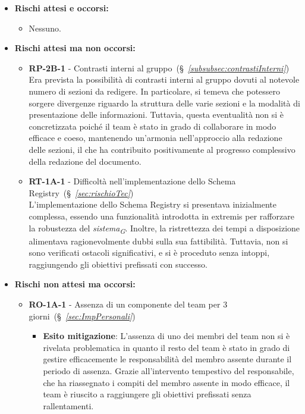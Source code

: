 \begin{itemize}
    \item \textbf{Rischi attesi e occorsi:}
        \begin{itemize}
            \item Nessuno.
        \end{itemize}
    \item \textbf{Rischi attesi ma non occorsi:}
        \begin{itemize}
            \item \textbf{RP-2B-1} - Contrasti interni al gruppo~(\S~\textit{\ref{subsubsec:contrastiInterni}}) \\
            Era prevista la possibilità di contrasti interni al gruppo dovuti al notevole numero di sezioni da redigere. In particolare, si temeva che potessero sorgere divergenze riguardo la struttura delle varie sezioni e la modalità di presentazione delle informazioni. Tuttavia, questa eventualità non si è concretizzata poiché il team è stato in grado di collaborare in modo efficace e coeso, mantenendo un'armonia nell'approccio alla redazione delle sezioni, il che ha contribuito positivamente al progresso complessivo della redazione del documento.
            \item \textbf{RT-1A-1} - Difficoltà nell’implementazione dello Schema Registry~(\S~\textit{\ref{sec:rischioTec}}) \\
            L'implementazione dello Schema Registry si presentava inizialmente complessa, essendo una funzionalità introdotta in extremis per rafforzare la robustezza del \textit{sistema}\textsubscript{\textit{G}}. Inoltre, la ristrettezza dei tempi a disposizione alimentava ragionevolmente dubbi sulla sua fattibilità. Tuttavia, non si sono verificati ostacoli significativi, e si è proceduto senza intoppi, raggiungendo gli obiettivi prefissati con successo.
        \end{itemize}
    \item \textbf{Rischi non attesi ma occorsi:}
        \begin{itemize}
            \item \textbf{RO-1A-1} - Assenza di un componente del team per 3 giorni~(\S~\textit{\ref{sec:ImpPersonali}})
                \begin{itemize}
                    \item \textbf{Esito mitigazione}: L'assenza di uno dei membri del team non si è rivelata problematica in quanto il resto del team è stato in grado di gestire efficacemente le responsabilità del membro assente durante il periodo di assenza. Grazie all'intervento tempestivo del responsabile, che ha riassegnato i compiti del membro assente in modo efficace, il team è riuscito a raggiungere gli obiettivi prefissati senza rallentamenti.

\end{itemize}
\end{itemize}
\end{itemize}
